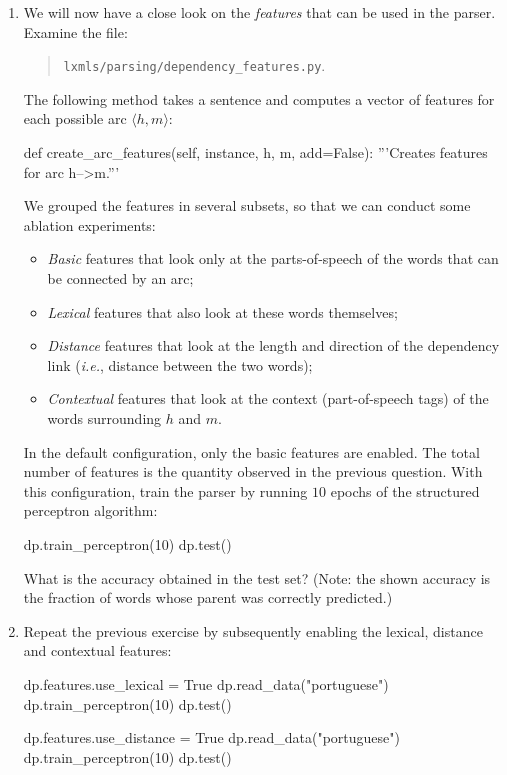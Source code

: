 \begin{exercise}
\begin{enumerate}
\item We will now have a close look on the \emph{features} that can be used in the parser. 
Examine the file:
\begin{quote}
{\tt lxmls/parsing/dependency\_features.py}. 
\end{quote}
The following method takes a sentence and computes a vector of features for each possible arc $\langle h, m \rangle$: 
\begin{python}
def create_arc_features(self, instance, h, m, add=False):
	'''Creates features for arc h-->m.'''
\end{python}
We grouped the features in several subsets, so that we can conduct some ablation experiments: 
\begin{itemize}
\item \emph{Basic} features that look only at the parts-of-speech of the words that can be connected by an arc;
\item \emph{Lexical} features that also look at these words themselves;
\item \emph{Distance} features that look at the length and direction of the dependency link (\emph{i.e.}, distance between the two words);
\item \emph{Contextual} features that look at the context (part-of-speech tags) of the words 
surrounding $h$ and $m$. 
\end{itemize}
In the default configuration, only the basic features are enabled. The total number of features 
is the quantity observed in the previous question. 
With this configuration, 
train the parser by running $10$ epochs of the structured perceptron algorithm: 
\begin{python}
dp.train_perceptron(10)
dp.test()
\end{python}
What is the accuracy obtained in the test set? (Note: the shown accuracy is the fraction of words whose parent was correctly predicted.)\\
\item Repeat the previous exercise by 
subsequently enabling the lexical, distance and contextual features:
\begin{python}
dp.features.use_lexical = True
dp.read_data("portuguese")
dp.train_perceptron(10)
dp.test()

dp.features.use_distance = True
dp.read_data("portuguese")
dp.train_perceptron(10)
dp.test()


\end{python}
\end{enumerate}
\end{exercise}
